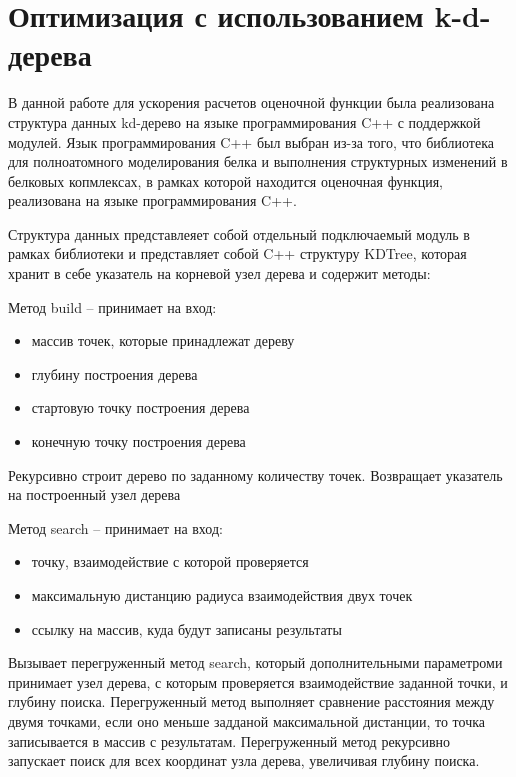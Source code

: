 \section{Оптимизация с использованием k-d-дерева}


В данной работе для ускорения расчетов оценочной функции была реализована структура данных kd-дерево на языке программирования C++ с поддержкой модулей. Язык программирования C++ был выбран из-за того, что библиотека для полноатомного моделирования белка и выполнения структурных изменений в белковых копмлексах, в рамках которой находится оценочная функция, реализована на языке программирования C++.

Структура данных представлеяет собой отдельный подключаемый модуль в рамках библиотеки и представляет собой C++ структуру \newline KDTree, которая хранит в себе указатель на корневой узел дерева и содержит методы:

Метод build -- принимает на вход:

\begin{itemize}
	\item массив точек, которые принадлежат дереву
	\item глубину построения дерева
	\item стартовую точку построения дерева
	\item конечную точку построения дерева
\end{itemize}

Рекурсивно строит дерево по заданному количеству точек. Возвращает указатель на построенный узел дерева

Метод search -- принимает на вход:
\begin{itemize}
	\item точку, взаимодействие с которой проверяется
	\item максимальную дистанцию радиуса взаимодействия двух точек
	\item ссылку на массив, куда будут записаны результаты
\end{itemize}

Вызывает перегруженный метод search, который дополнительными параметроми принимает узел дерева, с которым проверяется взаимодействие заданной точки, и глубину поиска. Перегруженный метод выполняет сравнение расстояния между двумя точками, если оно меньше задданой максимальной дистанции, то точка записывается в массив с результатам. Перегруженный метод рекурсивно запускает поиск для всех координат узла дерева, увеличивая глубину поиска.


